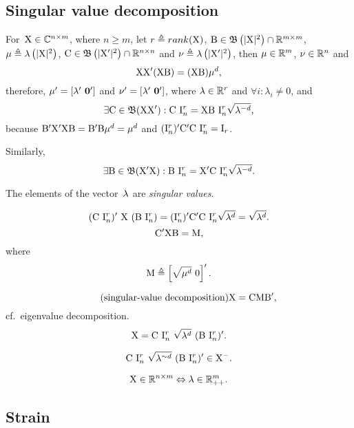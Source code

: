 \documentclass[10pt,a4paper]{article}
\theoremstyle{plain} \newtheorem{Lem}{Lemma}
\begin{document}
\subsection{Singular value decomposition}

For~$\mathrm X \in \mathbb C^{n \times m}$, where $n \ge m$,
let
$r \triangleq rank(\mathrm X)$,
$\mathrm B \in \mathfrak B\left(|\mathrm X|^2\right) \cap \mathbb R^{m \times m}$,    $\mathbf \mu \triangleq \lambda\left(|\mathrm X|^2\right)$, 
$\mathrm C \in \mathfrak B\left(|\mathrm X'|^2\right) \cap \mathbb R^{n \times n}$ and $\mathbf \nu \triangleq \lambda\left(|\mathrm X'|^2\right)$, 
then
$\mathbf \mu \in \mathbb R^m$,
$\mathbf \nu \in \mathbb R^n$
and
$$ \mathrm X \mathrm X' (\mathrm X \mathrm B) = (\mathrm X \mathrm B) \mathbf \mu^d, $$ 
therefore, $\mathbf \mu' = [\mathbf \lambda' \ \mathbf 0']$ and $\mathbf \nu' = [\mathbf \lambda' \ \mathbf 0']$, where $\mathbf \lambda \in \mathbb R^r$ and $\forall i : \lambda_i \ne 0$,
and
\begin{equation} \label{rectangular_eigenvectors}
\exists \mathrm C \in \mathfrak B(\mathrm X \mathrm X') : \mathrm C \ \mathrm I^r_n = \mathrm X \mathrm B \ \mathrm I^r_n \sqrt{\mathbf \lambda^{-d}}, 
\end{equation}
because $\mathrm B' \mathrm X' \mathrm X \mathrm B = \mathrm B' \mathrm B \mathbf \mu^d = \mathbf \mu^d$ and $(\mathrm I^r_n)' \mathrm C' \mathrm C \ \mathrm I^r_n = \mathrm I_r$.

Similarly,
$$ \exists \mathrm B \in \mathfrak B(\mathrm X' \mathrm X) : \mathrm B \ \mathrm I^r_n = \mathrm X' \mathrm C \ \mathrm I^r_n \sqrt{\mathbf \lambda^{-d}}. $$

The elements of the vector~$\mathbf \lambda$ are {\em singular values}.

$$ (\mathrm C \ \mathrm I^r_n)' \ \mathrm X \ (\mathrm B \ \mathrm I^r_n) = (\mathrm I^r_n)' \mathrm C ' \mathrm C \ \mathrm I^r_n \sqrt{\mathbf \lambda^d} = \sqrt{\mathbf \lambda^d}. $$
$$ \mathrm C' \mathrm X \mathrm B = \mathrm M, $$
where 
$$ \mathrm M \triangleq \left[\sqrt{\mathbf \mu^d} \ \mathrm 0 \right]'. $$

\begin{equation*} \tag{singular-value decomposition}
  \mathrm X = \mathrm C \mathrm M \mathrm B',
\end{equation*}
cf.~eigenvalue decomposition.
$$ \mathrm X = \mathrm C \ \mathrm I^r_n \ \sqrt{\mathbf \lambda^d} \ (\mathrm B \ \mathrm I^r_n)'. $$

$$ \mathrm C \ \mathrm I^r_n \ \sqrt{\mathbf \lambda^{\sim d}} \ (\mathrm B \ \mathrm I^r_n)' \in \mathrm X^-. $$

$$ \mathrm X \in \mathbb R^{n \times m} \Leftrightarrow \mathbf \lambda \in \mathbb R_{++}^m. $$



\subsection{Strain}
\end{document}
